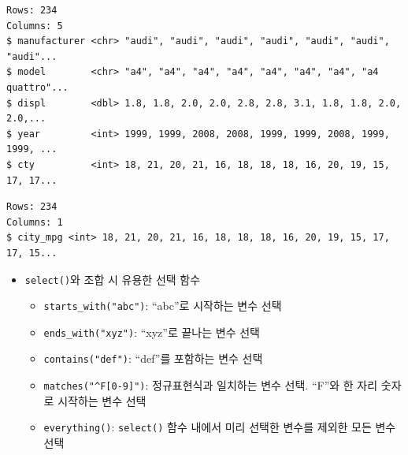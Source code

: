\documentclass[
  11pt,
]{krantz}
\newenvironment{Shaded}{\begin{snugshade}}{\end{snugshade}}
\newcommand{\CommentTok}[1]{\textcolor[rgb]{0.37,0.37,0.37}{\textit{#1}}}
\newcommand{\DataTypeTok}[1]{\textcolor[rgb]{0.27,0.27,0.27}{#1}}
\newcommand{\KeywordTok}[1]{\textcolor[rgb]{0.27,0.27,0.27}{\textbf{#1}}}
\newcommand{\NormalTok}[1]{#1}
\newcommand{\OperatorTok}[1]{\textcolor[rgb]{0.43,0.43,0.43}{\textbf{#1}}}
\newcommand{\StringTok}[1]{\textcolor[rgb]{0.5,0.5,0.5}{#1}}
\providecommand{\tightlist}{%
  \setlength{\itemsep}{0pt}\setlength{\parskip}{0pt}}
\begin{document}
\begin{Shaded}
\end{Shaded}

\begin{verbatim}
Rows: 234
Columns: 5
$ manufacturer <chr> "audi", "audi", "audi", "audi", "audi", "audi", "audi"...
$ model        <chr> "a4", "a4", "a4", "a4", "a4", "a4", "a4", "a4 quattro"...
$ displ        <dbl> 1.8, 1.8, 2.0, 2.0, 2.8, 2.8, 3.1, 1.8, 1.8, 2.0, 2.0,...
$ year         <int> 1999, 1999, 2008, 2008, 1999, 1999, 2008, 1999, 1999, ...
$ cty          <int> 18, 21, 20, 21, 16, 18, 18, 18, 16, 20, 19, 15, 17, 17...
\end{verbatim}

\begin{Shaded}
\end{Shaded}

\begin{verbatim}
Rows: 234
Columns: 1
$ city_mpg <int> 18, 21, 20, 21, 16, 18, 18, 18, 16, 20, 19, 15, 17, 17, 15...
\end{verbatim}

\normalsize

\begin{itemize}
\item
  \texttt{select()}와 조합 시 유용한 선택 함수

  \begin{itemize}
  \tightlist
  \item
    \texttt{starts\_with("abc")}: ``abc''로 시작하는 변수 선택
  \item
    \texttt{ends\_with("xyz")}: ``xyz''로 끝나는 변수 선택
  \item
    \texttt{contains("def")}: ``def''를 포함하는 변수 선택
  \item
    \texttt{matches("\^{}F{[}0-9{]}")}: 정규표현식과 일치하는 변수 선택. ``F''와 한 자리 숫자로 시작하는 변수 선택
  \item
    \texttt{everything()}: \texttt{select()} 함수 내에서 미리 선택한 변수를 제외한 모든 변수 선택
  \end{itemize}
\end{itemize}
\end{document}
